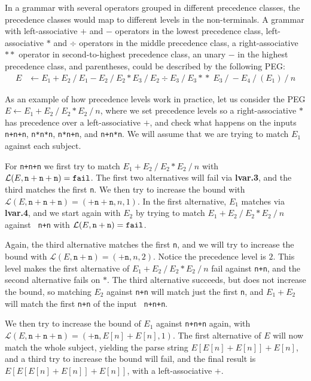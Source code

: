 In a grammar with several operators grouped in different precedence
classes, the precedence classes would map to different levels in the
non-terminals. A grammar with left-associative $+$ and $-$ operators
in the lowest precedence class, left-associative $*$ and $\div$
operators in the middle precedence class, a right-associative $**$
operator in second-to-highest precedence class, an unary $-$ in the
highest precedence class, and parentheses, could be described by the
following PEG:
\begin{align*}
E & \leftarrow E_1 + E_2 \ / \ E_1 - E_2 \ /\ E_2 * E_3 \ /\ E_2 \div
E_3 \ /\ E_3 *\!*\; E_3 \ / \ -E_4 \ / \ (E_1) \ / \ n 
\end{align*}

As an example of how precedence levels work in practice, let us
consider the PEG $E \leftarrow E_1+E_2 \ /\ E_2*E_2 \ /\ n$, where we
set precedence levels so a right-associative $*$ has precedence over a
left-associative $+$, and check what happens on the inputs {\tt
  n+n+n}, {\tt n*n*n}, {\tt n*n+n}, and {\tt n+n*n}. We will assume
that we are trying to match $E_1$ against each subject.

For {\tt n+n+n} we first try to match $E_1+E_2 \ /\ E_2*E_2 \ /\ n$
with $\mathcal{L}(E,\mathtt{n+n+n}) = \Nothing$. The first two
alternatives will fail via {\bf lvar.3}, and the third matches the
first {\tt n}. We then try to increase the bound with
$\mathcal{L}(E,\mathtt{n+n+n}) = (\mathtt{+n+n},n,1)$. In the first
alternative, $E_1$ matches via {\bf lvar.4}, and we start again with
$E_2$ by trying to match $E_1+E_2 \ /\ E_2*E_2 \ /\ n$ against {\tt
  n+n} with $\mathcal{L}(E,\mathtt{n+n}) = \Nothing$. 

Again, the third
alternative matches the first {\tt n}, and we will try to increase the
bound with $\mathcal{L}(E,\mathtt{n+n}) = (\mathtt{+n},n,2)$. Notice
the precedence level is $2$. This level makes the first alternative of $E_1+E_2 \ /\ E_2*E_2 \
/\ n$ fail against {\tt n+n}, and the second alternative fails on
$*$. The third alternative succeeds, but does not increase the bound,
so matching $E_2$ against {\tt n+n} will match just the first {\tt n},
and $E_1+E_2$ will match the first {\tt n+n} of the input {\tt
  n+n+n}. 

We then try to increase the bound of $E_1$ against {\tt n+n+n} again,
 with $\mathcal{L}(E,\mathtt{n+n+n}) = (\mathtt{+n},E[n]+E[n],1)$. The
 first alternative of $E$ will now match the whole subject, yielding
 the parse string $E[E[n]+E[n]]+E[n]$, and a third try to increase the bound
 will fail, and the final result is $E[E[E[n]+E[n]]+E[n]]$, with a
 left-associative $+$.

